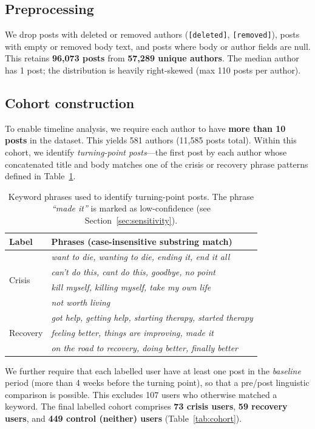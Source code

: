 \documentclass[11pt]{article}
\begin{document}
\subsection{Preprocessing}
We drop posts with deleted or removed authors (\texttt{[deleted]},
\texttt{[removed]}), posts with empty or removed body text, and posts
where body or author fields are null.
This retains \textbf{96{,}073 posts} from \textbf{57{,}289 unique authors}.
The median author has 1 post; the distribution is heavily right-skewed
(max 110 posts per author).

\subsection{Cohort construction}
To enable timeline analysis, we require each author to have
\textbf{more than 10 posts} in the dataset.
This yields 581 authors (11{,}585 posts total).
Within this cohort, we identify \emph{turning-point posts}---the first
post by each author whose concatenated title and body matches one of the
crisis or recovery phrase patterns defined in Table~\ref{tab:keywords}.

\begin{table}[h]
\small
\centering
\begin{tabular}{ll}
\toprule
\textbf{Label} & \textbf{Phrases (case-insensitive substring match)} \\
\midrule
\multirow{4}{*}{Crisis}
  & \textit{want to die, wanting to die, ending it, end it all} \\
  & \textit{can't do this, cant do this, goodbye, no point} \\
  & \textit{kill myself, killing myself, take my own life} \\
  & \textit{not worth living} \\
\midrule
\multirow{4}{*}{Recovery}
  & \textit{got help, getting help, starting therapy, started therapy} \\
  & \textit{feeling better, things are improving, made it} \\
  & \textit{on the road to recovery, doing better, finally better} \\
\bottomrule
\end{tabular}
\caption{Keyword phrases used to identify turning-point posts.
The phrase \emph{``made it''} is marked as low-confidence
(see Section~\ref{sec:sensitivity}).}
\label{tab:keywords}
\end{table}

We further require that each labelled user have at least one post in the
\emph{baseline} period (more than 4 weeks before the turning point), so
that a pre/post linguistic comparison is possible.
This excludes 107 users who otherwise matched a keyword.
The final labelled cohort comprises \textbf{73 crisis users},
\textbf{59 recovery users}, and \textbf{449 control (neither) users}
(Table~\ref{tab:cohort}).
\end{document}

